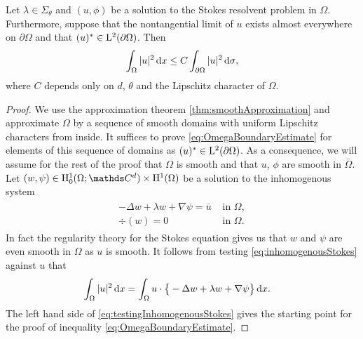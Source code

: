 \begin{lem}
  \label{lem:l2unique}
  Let $\lambda \in \Sigma_\theta$ and $(u,\phi)$ be a solution to the Stokes resolvent problem in $\Omega$.
  Furthermore, suppose that the nontangential limit of $u$ exists almost everywhere on $\partial\Omega$ and that $(u)^* \in \mathrm{L}^2(\partial\Omega)$.
  Then 
  \begin{align}
    \label{eq:OmegaBoundaryEstimate}
    \int_\Omega |u|^2 \, {\operatorname{d}\!{x}} \leq C \int_{\partial\Omega} |u|^2 \, {\operatorname{d}\!{\sigma}},
  \end{align}
  where $C$ depends only on $d$, $\theta$ and the Lipschitz character of $\Omega$.
\end{lem}

\begin{proof}
  We use the approximation theorem \ref{thm:smoothApproximation} and approximate $\Omega$ by a sequence of smooth domains with uniform Lipschitz characters from inside.
  It suffices to prove \eqref{eq:OmegaBoundaryEstimate} for elements of this sequence of domains as $(u)^* \in \mathrm{L}^2(\partial\Omega)$.
  As a consequence, we will assume for the rest of the proof that $\Omega$ is smooth and that $u$, $\phi$ are smooth in $\overline\Omega$.
  Let $(w,\psi) \in \HH_0^1(\Omega; \C^d) \times \HH^1(\Omega)$ be a solution to the inhomogenous system
  \begin{align}
    \label{eq:inhomogenousStokes}
    \begin{alignedat}{1}
      - \Delta w + \lambda w + \nabla \psi = \overline u &\text{ in } \Omega, \\
      \div(w) = 0 &\text{ in } \Omega.
    \end{alignedat}
  \end{align}
  In fact the regularity theory for the Stokes equation gives us that $w$ and $\psi$ are even smooth in $\Omega$ as $u$ is smooth.
  It follows from testing \eqref{eq:inhomogenousStokes} against $u$ that
  \begin{align}
    \label{eq:testingInhomogenousStokes}
    \int_\Omega |u|^2 \, {\operatorname{d}\!{x}}
    &= \int_\Omega u \cdot \big\{ - \Delta w + \lambda w + \nabla \psi \big\} \, {\operatorname{d}\!{x}}.
  \end{align}
  The left hand side of \eqref{eq:testingInhomogenousStokes} gives the starting point for the proof of inequality \eqref{eq:OmegaBoundaryEstimate}.
  

\end{proof}
